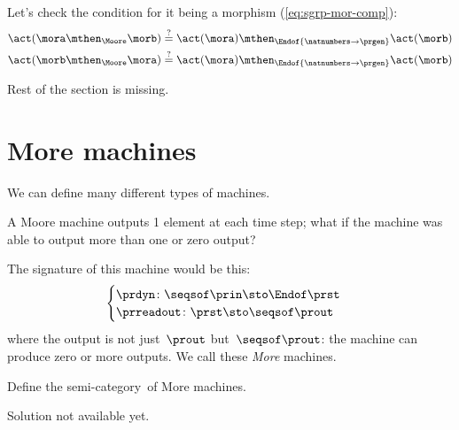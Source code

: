 Let's check the condition for it being a morphism (\cref{eq:sgrp-mor-comp}):
%
\begin{align}
    \act ( \mora \mthen_{\Moore} \morb) & \stackrel{?}{=}  \act ( \mora) \mthen_{\Endof  {\natnumbers \to \prgen}} \act(\morb) \label{eq:actions-on-sequences-left}  \\
    \act ( \morb \mthen_{\Moore} \mora) & \stackrel{?}{=}  \act ( \mora) \mthen_{\Endof  {\natnumbers \to \prgen}} \act(\morb) \label{eq:actions-on-sequences-right} 
\end{align}
\begin{publictodo}
    Rest of the section is missing.
\end{publictodo}


\section{More machines}

We can define many different types of machines.

A Moore machine outputs 1 element at each time step; what if the machine was able to output more than one or zero output?

The signature of this machine would be this:
%
\begin{equation}
    \label{eq:more-signature}
    \begin{cases}
        \prdyn \colon \seqsof\prin \sto \Endof \prst \\
        \prreadout \colon \prst \sto \seqsof \prout
    \end{cases}
\end{equation}
%
where the output is not just~$\prout$ but~$\seqsof \prout$: the machine can produce zero or more outputs.
We call these \emph{More} machines.

\begin{exercise}
    Define the semi-category~\More of More machines.
\end{exercise}
\begin{solution}
    \begin{publictodo}
        Solution not available yet.
    \end{publictodo}
\end{solution}

